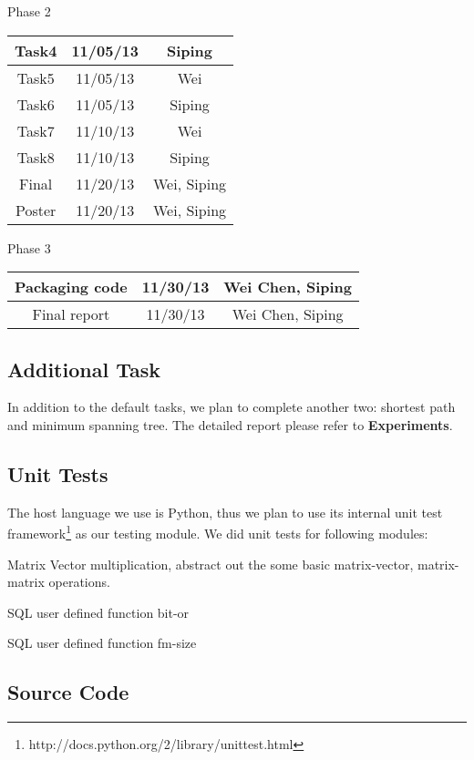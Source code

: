 \begin{center}
Phase 2\\
\begin{tabular}{|c|c|c|}
\hline
Task4 & 11/05/13 & Siping\\\hline
Task5 & 11/05/13 & Wei\\\hline
Task6 & 11/05/13 & Siping\\\hline
Task7 & 11/10/13 & Wei\\\hline
Task8 & 11/10/13 & Siping\\\hline
Final & 11/20/13 & Wei, Siping\\\hline
Poster & 11/20/13 & Wei, Siping\\\hline
\end{tabular}
\end{center}

\begin{center}
Phase 3\\
\begin{tabular}{|c|c|c|}
\hline
Packaging code & 11/30/13 & Wei Chen, Siping \\ \hline
Final report & 11/30/13 & Wei Chen, Siping \\ \hline
\end{tabular}
\end{center}


\subsection{Additional Task}
In addition to the default tasks,  we plan to complete another two:  shortest path and minimum spanning tree. The detailed report please refer to {\bf Experiments}.

\subsection{Unit Tests}
The host language we use is Python, thus we plan to use its internal unit test framework\footnote{http://docs.python.org/2/library/unittest.html} as our testing module. We did unit tests for following modules:
\bit
\item Matrix Vector multiplication, abstract out the some basic matrix-vector, matrix-matrix operations. 
\item SQL user defined function bit-or
\item SQL user defined function fm-size
\eit

\newpage
\subsection{Source Code}
